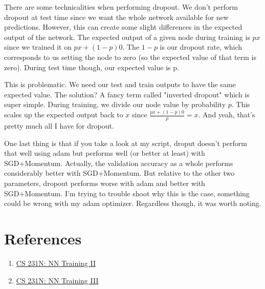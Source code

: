 \documentclass[12pt]{article}
\begin{document}
There are some technicalities when performing dropout. We don't perform dropout at test time since we 
want the whole network available for new predictions. However, this can create some slight differences 
in the expected output of the network. The expected output of a given node during training is 
$px$ since we trained it on $px + (1-p)0$. The $1-p$ is our dropout rate, which corresponds to us 
setting the node to zero (so the expected value of that term is zero). During test time though, our 
expected value is p. 

This is problematic. We need our test and train outputs to have the same expected value. The solution? 
A fancy term called "inverted dropout" which is super simple. During training, we
divide our node value by probability $p$. This scales up the expected output back to $x$ since 
$\frac{px + (1-p)0}{p} = x$. And yeah, that's pretty much all I have for dropout. 

One last thing is that if you take a look at my script, droput doesn't perform that well using adam 
but performs well (or better at least) with SGD+Momentum. Actually, the validation accuracy as a 
whole performs considerably better with SGD+Momentum. But relative to the other two parameters, dropout
performs worse with adam and better with SGD+Momentum. I'm trying to trouble shoot why this is the case, 
something could be wrong with my adam optimizer. Regardless though, it was worth noting. 


\section{References}

\begin{enumerate}
    \item \href{https://cs231n.github.io/neural-networks-2}{CS 231N: NN Training II}
    \item \href{https://cs231n.github.io/neural-networks-3}{CS 231N: NN Training III}
\end{enumerate}
\end{document}
